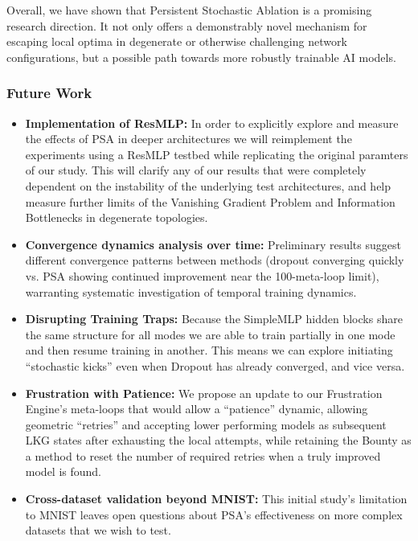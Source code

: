 \documentclass[conference]{IEEEtran}
\begin{document}
Overall, we have shown that Persistent Stochastic Ablation is a promising research direction. It not only offers a demonstrably novel mechanism for escaping local optima in degenerate or otherwise challenging network configurations, but a possible path towards more robustly trainable AI models.

\subsubsection{Future Work}

\begin{itemize}

\item \textbf{Implementation of ResMLP:} In order to explicitly explore and measure the effects of PSA in deeper architectures we will reimplement the experiments using a ResMLP testbed while replicating the original paramters of our study. This will clarify any of our results that were completely dependent on the instability of the underlying test architectures, and help measure further limits of the Vanishing Gradient Problem and Information Bottlenecks in degenerate topologies.

\item \textbf{Convergence dynamics analysis over time:} Preliminary results suggest different convergence patterns between methods (dropout converging quickly vs. PSA showing continued improvement near the 100-meta-loop limit), warranting systematic investigation of temporal training dynamics.

\item \textbf{Disrupting Training Traps:} Because the SimpleMLP hidden blocks share the same structure for all modes we are able to train partially in one mode and then resume training in another. This means we can explore initiating ``stochastic kicks'' even when Dropout has already converged, and vice versa.

\item \textbf{Frustration with Patience:} We propose an update to our Frustration Engine's meta-loops that would allow a ``patience'' dynamic, allowing geometric ``retries'' and accepting lower performing models as subsequent LKG states after exhausting the local attempts, while retaining the Bounty as a method to reset the number of required retries when a truly improved model is found.

\item \textbf{Cross-dataset validation beyond MNIST:} This initial study's limitation to MNIST leaves open questions about PSA's effectiveness on more complex datasets that we wish to test.


\end{itemize}
\end{document}
